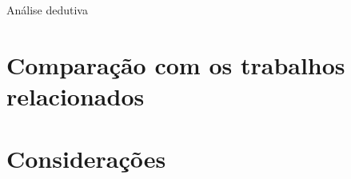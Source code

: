 Análise dedutiva




\section{Comparação com os trabalhos relacionados}
\label{sec:comparacao}

\section{Considerações}
\label{sec:}



















































































